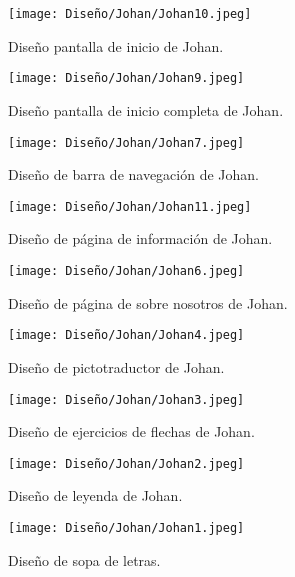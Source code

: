 \begin{figure}[ht!]
    \centering
    \texttt{[image: Diseño/Johan/Johan10.jpeg]}
    \caption{Diseño pantalla de inicio de Johan.}
    \label{Johan10}
  \end{figure}
  
  \begin{figure}[ht!]
    \centering
    \texttt{[image: Diseño/Johan/Johan9.jpeg]}
    \caption{Diseño pantalla de inicio completa de Johan.}
    \label{Johan9}
  \end{figure}
  
  \begin{figure}[ht!]
    \centering
    \texttt{[image: Diseño/Johan/Johan7.jpeg]}
    \caption{Diseño de barra de navegación de Johan.}
    \label{Johan7}
  \end{figure}
  
  \begin{figure}[ht!]
    \centering
    \texttt{[image: Diseño/Johan/Johan11.jpeg]}
    \caption{Diseño de página de información de Johan.}
    \label{Johan11}
  \end{figure}
  
  \begin{figure}[ht!]
    \centering
    \texttt{[image: Diseño/Johan/Johan6.jpeg]}
    \caption{Diseño de página de sobre nosotros de Johan.}
    \label{Johan6}
  \end{figure}
  
  \begin{figure}[ht!]
    \centering
    \texttt{[image: Diseño/Johan/Johan4.jpeg]}
    \caption{Diseño de pictotraductor de Johan.}
    \label{Johan4}
  \end{figure}
  
  \begin{figure}[ht!]
    \centering
    \texttt{[image: Diseño/Johan/Johan3.jpeg]}
    \caption{Diseño de ejercicios de flechas de Johan.}
    \label{Johan3}
  \end{figure}
  
  \begin{figure}[ht!]
    \centering
  
  \texttt{[image: Diseño/Johan/Johan2.jpeg]}
    \caption{Diseño de leyenda de Johan.}
    \label{Johan2}
  \end{figure}
  
  \begin{figure}[ht!]
    \centering
  \texttt{[image: Diseño/Johan/Johan1.jpeg]}
    \caption{Diseño de sopa de letras.}
    
    \label{Johan1}
  \end{figure}
  
  